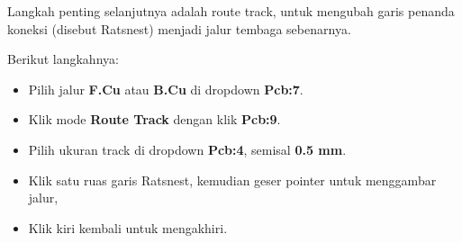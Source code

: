 \documentclass[12pt]{book}
\begin{document}
	Langkah penting selanjutnya adalah route track, untuk mengubah garis penanda koneksi (disebut Ratsnest)
	menjadi jalur tembaga sebenarnya.

	Berikut langkahnya:
	\begin{itemize}
		\item Pilih jalur \textbf{F.Cu} atau \textbf{B.Cu} di dropdown \textbf{Pcb:7}.

		\item Klik mode \textbf{Route Track} dengan klik \textbf{Pcb:9}.

		\item Pilih ukuran track di dropdown \textbf{Pcb:4}, semisal \textbf{0.5 mm}.

		\item Klik satu ruas garis Ratsnest, kemudian geser pointer untuk menggambar jalur,

		\item Klik kiri kembali untuk mengakhiri.
	\end{itemize}
\end{document}
